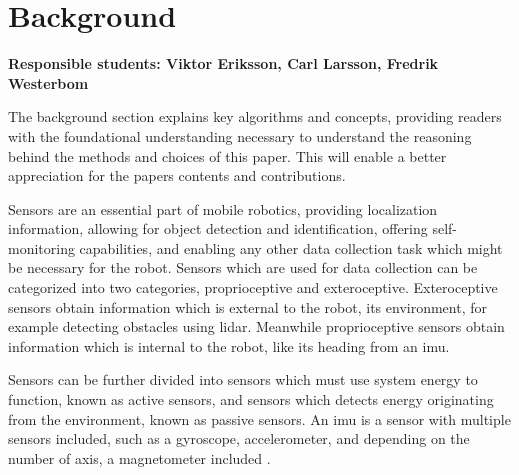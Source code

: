 \section{Background}
\label{section:background}


\textbf{Responsible students: Viktor Eriksson, Carl Larsson, Fredrik Westerbom}


The background section explains key algorithms and concepts, providing readers with the foundational understanding necessary to understand the reasoning behind the methods and choices of this paper. This will enable a better appreciation for the papers contents and contributions. 



Sensors are an essential part of mobile robotics, providing localization information, allowing for object detection and identification, offering self-monitoring capabilities, and enabling any other data collection task which might be necessary for the robot\:\cite{alatise_review_2020}.
Sensors which are used for data collection can be categorized into two categories, proprioceptive and exteroceptive\:\cite{alatise_review_2020}. Exteroceptive sensors obtain information which is external to the robot, its environment, for example detecting obstacles using \ac{lidar}\:\cite{alatise_review_2020}. Meanwhile proprioceptive sensors obtain information which is internal to the robot, like its heading from an \ac{imu}\:\cite{alatise_review_2020}.

Sensors can be further divided into sensors which must use system energy to function, known as active sensors, and sensors which detects energy originating from the environment, known as passive sensors\:\cite{alatise_review_2020}.
An \ac{imu} is a sensor with multiple sensors included, such as a gyroscope, accelerometer, and depending on the number of axis, a magnetometer included \cite{insert_source}. 

